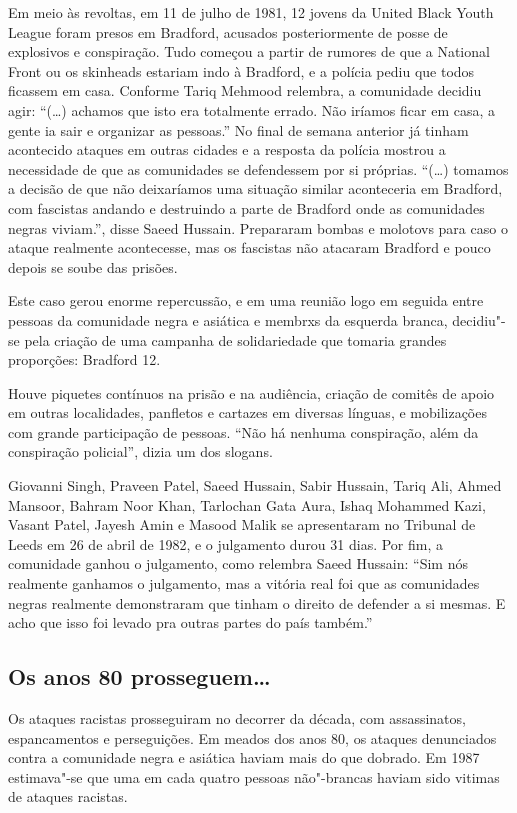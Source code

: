 Em meio às revoltas, em 11 de julho de 1981, 12 jovens da United Black Youth League foram presos em Bradford, acusados posteriormente de posse de explosivos e conspiração. Tudo começou a partir de rumores de que a National Front ou os skinheads estariam indo à Bradford, e a polícia pediu que todos ficassem em casa. Conforme Tariq Mehmood relembra, a comunidade decidiu agir: ``(\ldots{}) achamos que isto era totalmente errado. Não iríamos ficar em casa, a gente ia sair e organizar as pessoas.'' No final de semana anterior já tinham acontecido ataques em outras cidades e a resposta da polícia mostrou a necessidade de que as comunidades se defendessem por si próprias. ``(\ldots{}) tomamos a decisão de que não deixaríamos uma situação similar aconteceria em Bradford, com fascistas andando e destruindo a parte de Bradford onde as comunidades negras viviam.'', disse Saeed Hussain. Prepararam bombas e molotovs para caso o ataque realmente acontecesse, mas os fascistas não atacaram Bradford e pouco depois se soube das prisões.

Este caso gerou enorme repercussão, e em uma reunião logo em seguida entre pessoas da comunidade negra e asiática e membrxs da esquerda branca, decidiu"-se pela criação de uma campanha de solidariedade que tomaria grandes proporções: Bradford 12.

Houve piquetes contínuos na prisão e na audiência, criação de comitês de apoio em outras localidades, panfletos e cartazes em diversas línguas, e mobilizações com grande participação de pessoas. ``Não há nenhuma conspiração, além da conspiração policial'', dizia um dos slogans.

Giovanni Singh, Praveen Patel, Saeed Hussain, Sabir Hussain, Tariq Ali, Ahmed Mansoor, Bahram Noor Khan, Tarlochan Gata Aura, Ishaq Mohammed Kazi, Vasant Patel, Jayesh Amin e Masood Malik se apresentaram no Tribunal de Leeds em 26 de abril de 1982, e o julgamento durou 31 dias. Por fim, a comunidade ganhou o julgamento, como relembra Saeed Hussain: ``Sim nós realmente ganhamos o julgamento, mas a vitória real foi que as comunidades negras realmente demonstraram que tinham o direito de defender a si mesmas. E acho que isso foi levado pra outras partes do país também.''


\subsection{Os anos 80 prosseguem\ldots{}}

Os ataques racistas prosseguiram no decorrer da década, com assassinatos, espancamentos e perseguições. Em meados dos anos 80, os ataques denunciados contra a comunidade negra e asiática haviam mais do que dobrado. Em 1987 estimava"-se que uma em cada quatro pessoas não"-brancas haviam sido vitimas de ataques racistas.

